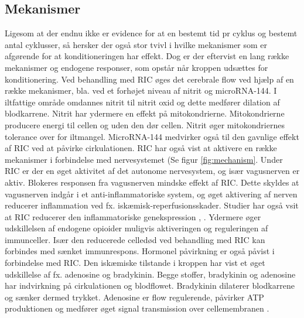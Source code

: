 \subsection{Mekanismer}
Ligesom at der endnu ikke er evidence for at en bestemt tid pr cyklus og bestemt antal cyklusser, så hersker der også stor tvivl i hvilke mekanismer som er afgørende for at konditioneringen har effekt.  Dog er der eftervist en lang række mekanismer og endogene responser, som opstår når kroppen udsættes for konditionering. Ved behandling med RIC øges det cerebrale flow ved hjælp af en række mekanismer, bla. ved et forhøjet niveau af nitrit og microRNA-144. I iltfattige område omdannes nitrit til nitrit oxid og dette medfører dilation af blodkarrene. Nitrit har ydermere en effekt på mitokondrierne. Mitokondrierne producere energi til cellen og uden den dør cellen. Nitrit øger mitokondriernes tolerance over for iltmangel. MicroRNA-144 medvirker også til den gavnlige effekt af RIC ved at påvirke cirkulationen.
RIC har også vist at aktivere en række mekanismer i forbindelse med nervesystemet (Se figur \ref{fig:mechanism}. Under RIC er der en øget aktivitet af det autonome nervesystem, og især vagusnerven er aktiv. Blokeres responsen fra vagusnerven mindske effekt af RIC. Dette skyldes at vagusnerven indgår i et anti-inflammatoriske system, og øget aktivering af nerven reducerer inflammation ved fx. iskæmisk-reperfusionsskader. Studier har også vsit at RIC reducerer den inflammatoriske genekspression \cite{RefWorks:20}, \cite{RefWorks:3}. Ydermere  øger udskillelsen af endogene opioider muligvis aktiveringen og reguleringen af immunceller. Især den reducerede celledød ved behandling med RIC kan forbindes med sænket immunrespons. Hormonel påvirkning er også påvist i forbindelse med RIC. Den iskæmiske tilstande i kroppen har vist et øget udskillelse af fx. adenosine og bradykinin. Begge stoffer, bradykinin og adenosine har indvirkning på cirkulationen og blodflowet. Bradykinin dilaterer blodkarrene og sænker dermed trykket. Adenosine er flow regulerende, påvirker ATP produktionen og medfører øget signal transmission over cellemembranen \cite{RefWorks:3}.

